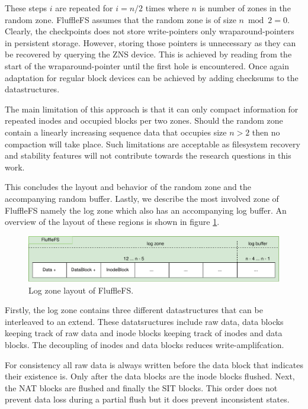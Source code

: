 These steps $i$ are repeated for $i = n/2$ times where $n$ is number of zones in
the random zone. FluffleFS assumes that the random zone is of size
$n \bmod 2 = 0$. Clearly, the checkpoints does not store write-pointers only
wraparound-pointers in persistent storage. However, storing those pointers is
unnecessary as they can be recovered by querying the ZNS device. This is
achieved by reading from the start of the wraparound-pointer until the first
hole is encountered. Once again adaptation for regular block devices can be
achieved by adding checksums to the datastructures.

The main limitation of this approach is that it can only compact information
for repeated inodes and occupied blocks per two zones. Should the random zone
contain a linearly increasing sequence data that occupies size $n > 2$ then no
compaction will take place. Such limitations are acceptable as filesystem
recovery and stability features will not contribute towards the research
questions in this work.

This concludes the layout and behavior of the random zone and the accompanying
random buffer. Lastly, we describe the most involved zone of FluffleFS namely
the log zone which also has an accompanying log buffer. An overview of the
layout of these regions is shown in figure \ref{figure:flufflelayoutlog}.

\begin{figure}[h!]
    \centering
	\includegraphics[width=1\textwidth]{resources/images/fluffle-layout-log.pdf}
	\caption{Log zone layout of FluffleFS.}
    \label{figure:flufflelayoutlog}
\end{figure}

Firstly, the log zone contains three different datastructures that can be
interleaved to an extend. These datatsructures include raw data, data blocks
keeping track of raw data and inode blocks keeping track of inodes and data
blocks. The decoupling of inodes and data blocks reduces write-amplifcation.

For consistency all raw data is always written before the data block that
indicates their existence is. Only after the data blocks are the inode blocks
flushed. Next, the NAT blocks are flushed and finally the SIT blocks. This order
does not prevent data loss during a partial flush but it does prevent
inconsistent states.

